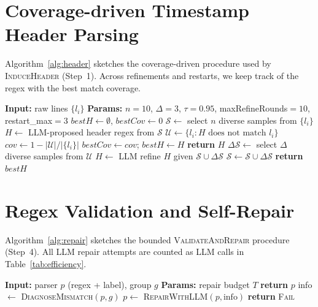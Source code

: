 \documentclass[journal]{IEEEtran}
\begin{document}
\appendices
\section{Coverage-driven Timestamp Header Parsing}
\label{app:header}
Algorithm~\ref{alg:header} sketches the coverage-driven procedure used by \textsc{InduceHeader} (Step~1). Across refinements and restarts, we keep track of the regex with the best match coverage.

\begin{algorithm}[!t]
	\caption{\textsc{InduceHeader} (sketch).}
	\label{alg:header}
	\begin{algorithmic}[1]
		\STATE \textbf{Input:} raw lines $\{l_i\}$
		\STATE \textbf{Params:} $n{=}10$, $\Delta{=}3$, $\tau{=}0.95$, maxRefineRounds$=10$, restart\_max$=3$
		\STATE $bestH \leftarrow \emptyset$, $bestCov \leftarrow 0$
		\STATE $\mathcal{S} \leftarrow$ select $n$ diverse samples from $\{l_i\}$
		\STATE $H \leftarrow$ LLM-proposed header regex from $\mathcal{S}$
		\STATE $\mathcal{U} \leftarrow \{l_i : H \text{ does not match } l_i\}$
		\STATE $cov \leftarrow 1 - |\mathcal{U}|/|\{l_i\}|$
		 \STATE $bestCov \leftarrow cov$; $bestH \leftarrow H$ \ENDIF
		 \STATE \textbf{return} $H$ \ENDIF
		\STATE $\Delta\mathcal{S} \leftarrow$ select $\Delta$ diverse samples from $\mathcal{U}$
		\STATE $H \leftarrow$ LLM refine $H$ given $\mathcal{S} \cup \Delta\mathcal{S}$
		\STATE $\mathcal{S} \leftarrow \mathcal{S} \cup \Delta\mathcal{S}$
		\ENDFOR
		\ENDFOR
		\STATE \textbf{return} $bestH$ 
	\end{algorithmic}
\end{algorithm}

\section{Regex Validation and Self-Repair}
\label{app:repair}
Algorithm~\ref{alg:repair} sketches the bounded \textsc{ValidateAndRepair} procedure (Step~4). All LLM repair attempts are counted as LLM calls in Table~\ref{tab:efficiency}.

\begin{algorithm}[!t]
	\caption{\textsc{ValidateAndRepair} (sketch).}
	\label{alg:repair}
	\begin{algorithmic}[1]
		\STATE \textbf{Input:} parser $p$ (regex + label), group $g$
		\STATE \textbf{Params:} repair budget $T$
		 \STATE \textbf{return} $p$ \ENDIF
		\STATE info $\leftarrow$ \textsc{DiagnoseMismatch}$(p,g)$
		\STATE $p \leftarrow$ \textsc{RepairWithLLM}$(p,\text{info})$
		\ENDFOR
		\STATE \textbf{return} \textsc{Fail}
	\end{algorithmic}
\end{algorithm}



\end{document}
